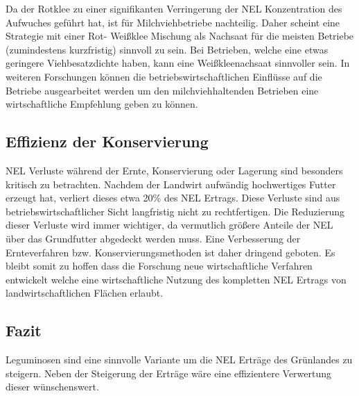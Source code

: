 Da der Rotklee zu einer signifikanten Verringerung der \ac{NEL} Konzentration des Aufwuches geführt hat, ist für Milchviehbetriebe nachteilig.
Daher scheint eine Strategie mit einer Rot- Weißklee Mischung als Nachsaat für die meisten Betriebe (zumindestens kurzfristig) sinnvoll zu sein.
Bei Betrieben, welche eine etwas geringere Viehbesatzdichte haben, kann eine Weißkleenachsaat sinnvoller sein.
In weiteren Forschungen können die betriebswirtschaftlichen Einflüsse auf die Betriebe ausgearbeitet werden um den milchviehhaltenden Betrieben eine wirtschaftliche Empfehlung geben zu können.


\subsection{Effizienz der Konservierung}
\label{sub:konservierung}
\ac{NEL} Verluste während der Ernte, Konservierung oder Lagerung sind besonders kritisch zu betrachten.
Nachdem der Landwirt aufwändig hochwertiges Futter erzeugt hat, verliert dieses etwa 20\% des \ac{NEL} Ertrags.
Diese Verluste sind aus betriebswirtschaftlicher Sicht langfristig nicht zu rechtfertigen.
Die Reduzierung dieser Verluste wird immer wichtiger, da vermutlich größere Anteile der \ac{NEL} über das Grundfutter abgedeckt werden muss.
Eine Verbesserung der Ernteverfahren bzw. Konservierungsmethoden ist daher dringend geboten.
Es bleibt somit zu hoffen dass die Forschung neue wirtschaftliche Verfahren entwickelt welche eine wirtschaftliche Nutzung des kompletten \ac{NEL} Ertrags von landwirtschaftlichen Flächen erlaubt.

\subsection{Fazit}
\label{subsec:fazit}
Leguminosen sind eine sinnvolle Variante um die \ac{NEL} Erträge des Grünlandes zu steigern.
Neben der Steigerung der Erträge wäre eine effizientere Verwertung dieser wünschenswert.
